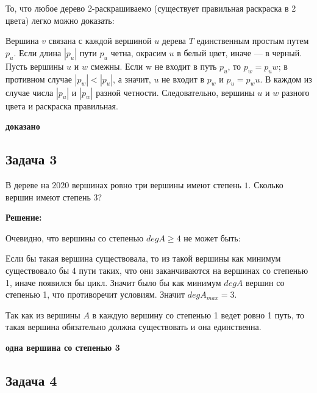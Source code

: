 \documentclass[a4paper,14pt]{article} %
\begin{document}
То, что любое дерево 2-раскрашиваемо (существует правильная раскраска в 2 цвета) легко можно доказать:

Вершина $v $ связана с каждой вершиной $u$ дерева $T$ единственным простым путем
$p_u$. Если длина $|p_u|$ пути $p_u$ четна, окрасим $u$ в белый цвет, иначе — в черный. Пусть
вершины $u$ и $w$ смежны. Если w не входит в путь $p_u$, то $p_w = p_uw$; в противном
случае $|p_w| < |p_u|$, а значит, $u$ не входит в $p_w$ и $p_u = p_wu$. В каждом из случае
числа $|p_u|$ и $|p_w|$ разной четности. Следовательно, вершины $ u$ и $w$ разного цвета и раскраска правильная.\\



\begin{flushright}
\begin{large}
\textbf {доказано}
\end{large}
\end{flushright}
\newpage

\begin{center}
\subsection{Задача 3}
\end{center}

 В дереве на $2020$ вершинах ровно три вершины имеют степень $1$.
Сколько вершин имеют степень $3$? 
\begin{center}
\bfseries
{\Large Решение: }
\end{center}

Очевидно, что вершины со степенью $degA \geqslant 4$ не может быть:

Если бы такая вершина существовала, то из такой вершины как минимум существовало бы 4 пути таких, что они заканчиваются на вершинах со степенью 1, иначе появился бы цикл. Значит было бы как минимум $degA$ вершин со степенью 1, что противоречит условиям. Значит $degA_{max} = 3$.

Так как из вершины $A$ в каждую вершину со степенью 1 ведет ровно 1 путь, то такая вершина обязательно должна существовать и она единственна.

\begin{flushright}
\begin{large}
\textbf {одна вершина со степенью 3 }
\end{large}
\end{flushright}


\begin{center}
\subsection{Задача 4}
\end{center}
\end{document}
